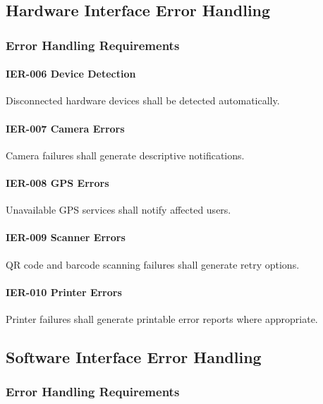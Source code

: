 \subsection{Hardware Interface Error Handling}

\subsubsection*{Error Handling Requirements}

\paragraph{IER-006 Device Detection}

Disconnected hardware devices shall be detected automatically.

\paragraph{IER-007 Camera Errors}

Camera failures shall generate descriptive notifications.

\paragraph{IER-008 GPS Errors}

Unavailable GPS services shall notify affected users.

\paragraph{IER-009 Scanner Errors}

QR code and barcode scanning failures shall generate retry options.

\paragraph{IER-010 Printer Errors}

Printer failures shall generate printable error reports where
appropriate.


\subsection{Software Interface Error Handling}

\subsubsection*{Error Handling Requirements}

